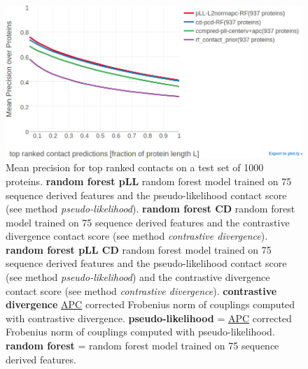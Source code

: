 \documentclass[11pt,a4paper,twoside]{book}
\theoremstyle{definition}
\theoremstyle{definition}
\theoremstyle{remark}
\begin{document}
\begin{figure}
\includegraphics[width=1\linewidth]{img/random_forest_contact_prior/additional_contat_score_features/precision_vs_rank_rf_pll_cd} \caption{Mean precision for top
ranked contacts on a test set of 1000 proteins. \textbf{random forest
pLL} random forest model trained on 75 sequence derived features and the
pseudo-likelihood contact score (see method \emph{pseudo-likelihood}).
\textbf{random forest CD} random forest model trained on 75 sequence
derived features and the contrastive divergence contact score (see
method \emph{contrastive divergence}). \textbf{random forest pLL CD}
random forest model trained on 75 sequence derived features and the
pseudo-likelihood contact score (see method \emph{pseudo-likelihood})
and the contrastive divergence contact score (see method
\emph{contrastive divergence}). \textbf{contrastive divergence}
\protect\hyperlink{abbrev}{APC} corrected Frobenius norm of couplings
computed with contrastive divergence. \textbf{pseudo-likelihood} =
\protect\hyperlink{abbrev}{APC} corrected Frobenius norm of couplings
computed with pseudo-likelihood. \textbf{random forest} = random forest
model trained on 75 sequence derived features.}\label{fig:performance-rf-additional-features}
\end{figure}
\end{document}
